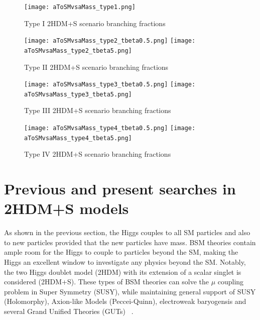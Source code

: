 \begin{figure}[ht!b]
  \centering
\texttt{[image: aToSMvsaMass\_type1.png]}           \\
    \caption{\label{fig:br2HDM-1} Type I 2HDM+S scenario branching fractions ~\cite{Branco_2012}}
\end{figure}

\begin{figure}[ht!b]
  \centering
\texttt{[image: aToSMvsaMass\_type2\_tbeta0.5.png]}
\texttt{[image: aToSMvsaMass\_type2\_tbeta5.png]}           \\
    \caption{\label{fig:br2HDM-2} Type II 2HDM+S scenario branching fractions ~\cite{Branco_2012}}
\end{figure}

\begin{figure}[ht!b]
  \centering
\texttt{[image: aToSMvsaMass\_type3\_tbeta0.5.png]}
\texttt{[image: aToSMvsaMass\_type3\_tbeta5.png]}           \\
    \caption{\label{fig:br2HDM-3} Type III 2HDM+S scenario branching fractions ~\cite{Branco_2012}}
\end{figure}



\begin{figure}[ht!b]
  \centering
\texttt{[image: aToSMvsaMass\_type4\_tbeta0.5.png]}
\texttt{[image: aToSMvsaMass\_type4\_tbeta5.png]}           \\
    \caption{\label{fig:br2HDM-4} Type IV 2HDM+S scenario branching fractions ~\cite{Branco_2012}}
\end{figure}

\section{Previous and present searches in 2HDM+S models}

As shown in the previous section, the Higgs couples to all SM particles and also to new particles provided that the new particles have mass.  
BSM theories contain ample room for the Higgs to couple to particles beyond the SM, making the Higgs an excellent window to investigate any physics beyond the SM.
Notably, the two Higgs doublet model (2HDM) with its extension of a scalar singlet is considered (2HDM+S).
These types of BSM theories can solve the $\mu$ coupling problem in Super Symmetry (SUSY), while maintaining general support of SUSY (Holomorphy), Axion-like Models (Peccei-Quinn), electroweak baryogensis and several Grand Unified Theories (GUTs) ~\cite{Branco_2012}.

